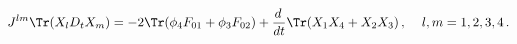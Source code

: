 \begin{equation}
J^{lm}\Tr(X_{l}D_{t}X_{m})= -2\Tr(\phi_{4}F_{01}+\phi_{3}F_{02}) +\displaystyle{\frac{d\,}{dt}\Tr(X_{1}X_{4}+X_{2}X_{3})\,,}~~~~l,m=1,2,3,4\,.
\end{equation}

